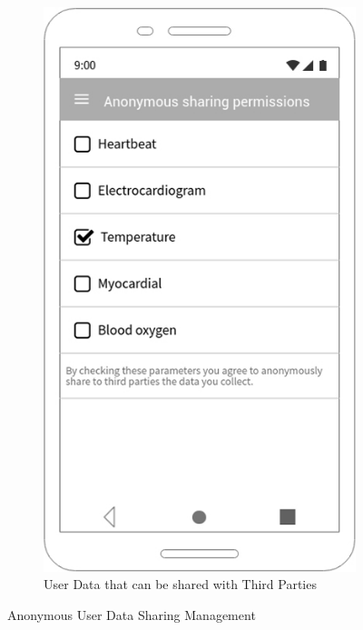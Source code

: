 \begin{figure}[h!]
\begin{subfigure}[b]{0.4\linewidth}
    \includegraphics[width=\linewidth]{img/mockup/u_anonym.jpg}
    \caption{User Data that can be shared with Third Parties}
  \end{subfigure}
  \caption{Anonymous User Data Sharing Management}
 \end{figure}

